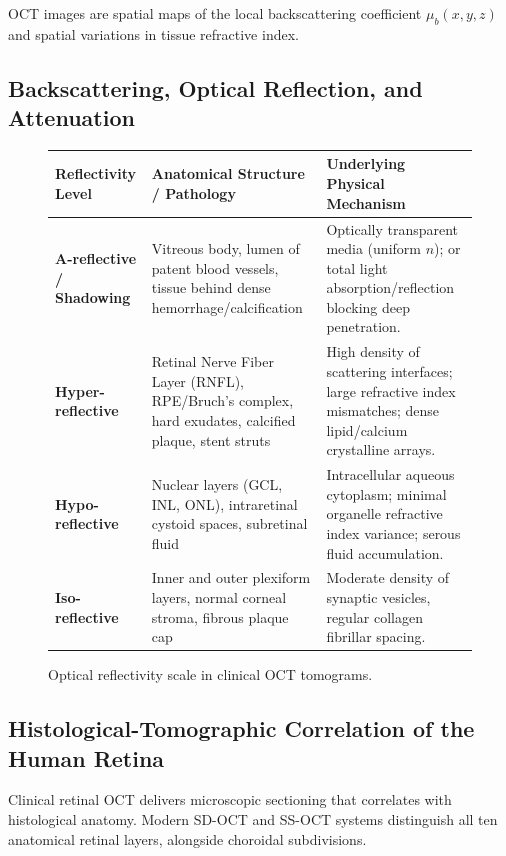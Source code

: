\documentclass[11pt,a4paper]{article}
\begin{document}
OCT images are spatial maps of the local backscattering coefficient $\mu_b(x, y, z)$ and spatial variations in tissue refractive index.

\subsection{Backscattering, Optical Reflection, and Attenuation}

\begin{figure}[htbp]
\centering
\setlength{\tabcolsep}{4pt}
\begin{tabular}{p{3.5cm}p{5.5cm}p{5.5cm}}
\toprule
\textbf{Reflectivity Level} & \textbf{Anatomical Structure / Pathology} & \textbf{Underlying Physical Mechanism} \\
\midrule
\textbf{A-reflective / Shadowing} & Vitreous body, lumen of patent blood vessels, tissue behind dense hemorrhage/calcification & Optically transparent media (uniform $n$); or total light absorption/reflection blocking deep penetration. \\
\addlinespace
\textbf{Hyper-reflective} & Retinal Nerve Fiber Layer (RNFL), RPE/Bruch's complex, hard exudates, calcified plaque, stent struts & High density of scattering interfaces; large refractive index mismatches; dense lipid/calcium crystalline arrays. \\
\addlinespace
\textbf{Hypo-reflective} & Nuclear layers (GCL, INL, ONL), intraretinal cystoid spaces, subretinal fluid & Intracellular aqueous cytoplasm; minimal organelle refractive index variance; serous fluid accumulation. \\
\addlinespace
\textbf{Iso-reflective} & Inner and outer plexiform layers, normal corneal stroma, fibrous plaque cap & Moderate density of synaptic vesicles, regular collagen fibrillar spacing. \\
\bottomrule
\end{tabular}
\caption{Optical reflectivity scale in clinical OCT tomograms.}
\label{tab:reflectivity_scale}
\end{figure}

\subsection{Histological-Tomographic Correlation of the Human Retina}

Clinical retinal OCT delivers microscopic sectioning that correlates with histological anatomy. Modern SD-OCT and SS-OCT systems distinguish all ten anatomical retinal layers, alongside choroidal subdivisions.
\end{document}
